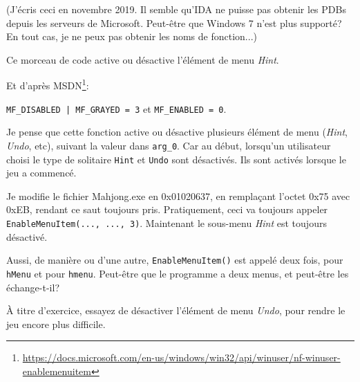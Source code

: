 (J'écris ceci en novembre 2019. Il semble qu'IDA ne puisse pas obtenir les PDBs
depuis les serveurs de Microsoft. Peut-être que Windows 7 n'est plus supporté?
En tout cas, je ne peux pas obtenir les noms de fonction...)



Ce morceau de code active ou désactive l'élément de menu \emph{Hint}.

Et d'après MSDN\footnote{\url{https://docs.microsoft.com/en-us/windows/win32/api/winuser/nf-winuser-enablemenuitem}}:

\verb$MF_DISABLED | MF_GRAYED = 3$ et \verb|MF_ENABLED = 0|.

Je pense que cette fonction active ou désactive plusieurs élément de menu (\emph{Hint},
\emph{Undo}, etc), suivant la valeur dans \verb|arg_0|.
Car au début, lorsqu'un utilisateur choisi le type de solitaire \verb|Hint| et
\verb|Undo| sont désactivés.
Ils sont activés lorsque le jeu a commencé.

Je modifie le fichier Mahjong.exe en 0x01020637, en remplaçant l'octet 0x75 avec
0xEB, rendant ce saut  toujours pris.
Pratiquement, ceci va toujours appeler \verb|EnableMenuItem(..., ..., 3)|.
Maintenant le sous-menu \emph{Hint} est toujours désactivé.

Aussi, de manière ou d'une autre, \verb|EnableMenuItem()| est appelé deux fois,
pour \verb|hMenu| et pour \verb|hmenu|.
Peut-être que le programme a deux menus, et peut-être les échange-t-il?

À titre d'exercice, essayez de désactiver l'élément de menu \emph{Undo}, pour rendre
le jeu encore plus difficile.
